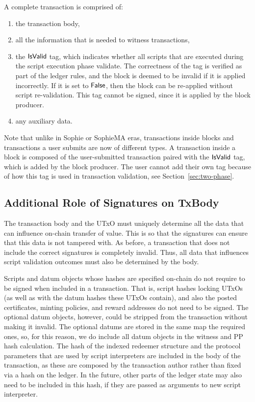 A complete transaction is comprised of:

\begin{enumerate}
  \item the transaction body,
  \item all the information that is needed to witness transactions,
  \item the $\mathsf{IsValid}$ tag, which indicates whether all scripts
  that are executed during the script execution phase validate.
  The correctness of the tag is verified as part of the ledger rules, and the block is
  deemed to be invalid if it is applied incorrectly.
  If it is set to $\mathsf{False}$, then the block can be re-applied without script re-validation.
  This tag cannot be signed, since it is applied by the block producer.
  \item any auxiliary data.
\end{enumerate}

Note that unlike in Sophie or SophieMA eras, transactions inside blocks and transactions
a user submits are now of different types. A transaction inside a block is composed of
the user-submitted transaction paired with the $\mathsf{IsValid}$ tag, which is
added by the block producer. The user cannot
add their own tag because of how this tag is used in transaction validation, see
Section~\ref{sec:two-phase}.

\subsection{Additional Role of Signatures on TxBody}

The transaction body and the UTxO must uniquely determine all the data
that can influence on-chain transfer of value.
This is so that the signatures can ensure that this data is not tampered with.
As before, a transaction that does not include the correct signatures is completely invalid.
Thus, all data that influences script validation outcomes must also be determined by the body.

Scripts and datum objects whose hashes are specified on-chain do not require to be
signed when included in a transaction. That is, script hashes locking UTxOs (as well as
with the datum hashes these UTxOs contain), and also the posted
certificates, minting policies, and reward addresses do not need to be signed.
The optional datum objects, however, could be stripped from the transaction without making
it invalid. The optional datums are stored in the same map the required ones, so,
for this reason, we do include all datum objects in the witness and PP hash calculation.
%
The hash of the indexed redeemer structure and the protocol parameters that are used by
script interpreters are included in the body of the transaction, as these are composed
by the transaction author rather than
fixed via a hash on the ledger. In the future, other parts of the ledger
state may also need to be included in this hash, if they are passed as
arguments to new script interpreter.


